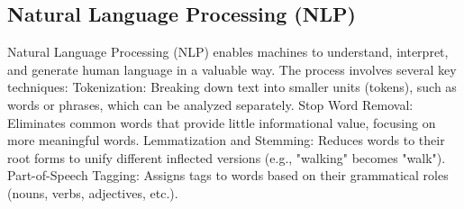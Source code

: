 \documentclass[12pt,oneside,openright,a4paper]{cpe-english-project}
\begin{document}


	
	


\subsection{Natural Language Processing (NLP)} Natural Language Processing (NLP) enables machines to understand, interpret, and generate human language in a valuable way. The process involves several key techniques: Tokenization: Breaking down text into smaller units (tokens), such as words or phrases, which can be analyzed separately. Stop Word Removal: Eliminates common words that provide little informational value, focusing on more meaningful words. Lemmatization and Stemming: Reduces words to their root forms to unify different inflected versions (e.g., "walking" becomes "walk"). Part-of-Speech Tagging: Assigns tags to words based on their grammatical roles (nouns, verbs, adjectives, etc.).
\end{document}
